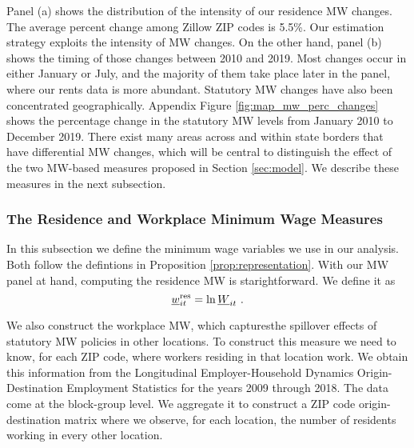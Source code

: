 Panel (a) shows the distribution of the intensity of our residence MW changes. 
The average percent change among Zillow ZIP codes is 5.5\%.
Our estimation strategy exploits the intensity of MW changes.
On the other hand, panel (b) shows the timing of those changes between 2010 and 
2019.
Most changes occur in either January or July, and the majority of them take 
place later in the panel, where our rents data is more abundant.
Statutory MW changes have also been concentrated geographically.
Appendix Figure \ref{fig:map_mw_perc_changes} shows the percentage change 
in the statutory MW levels from January 2010 to December 2019.
There exist many areas across and within state borders that have differential 
MW changes,
which will be central to distinguish the effect of the two MW-based measures
proposed in Section \ref{sec:model}. 
We describe these measures in the next subsection. 

\subsubsection*{The Residence and Workplace Minimum Wage Measures}

In this subsection we define the minimum wage variables we use in our analysis.
Both follow the defintions in Proposition \ref{prop:representation}.
With our MW panel at hand, 
computing the residence MW is starightforward.
We define it as
\begin{equation*}
    \underline{w}^{\text{res}}_{it} = \ln \underline{W}_{it} \ .
\end{equation*}

We also construct the workplace MW, which capturesthe spillover effects of
statutory MW policies in other locations.
To construct this measure we need to know, for each ZIP code, where workers 
residing in that location work.
We obtain this information from the Longitudinal Employer-Household 
Dynamics Origin-Destination Employment Statistics \parencite[LODES;][]{LODES}
for the years 2009 through 2018.
The data come at the block-group level.
We aggregate it to construct a ZIP code origin-destination matrix where we 
observe, for each location, the number of residents working in every other 
location.

